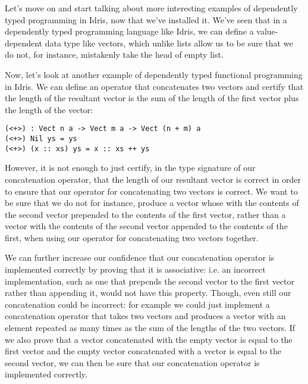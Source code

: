 Let's move on and start talking about more interesting examples of
dependently typed programming in Idris, now that we've installed it.
We've seen that in a dependently typed programming language like Idris,
we can define a value-dependent data type like vectors, which unlike lists
allow us to be sure that we do not, for instance, mistakenly take the
head of empty list.

Now, let's look at another example of dependently typed functional programming
in Idris. We can define an operator that concatenates two vectors and certify
that the length of the resultant vector is the sum of the length of the
first vector plus the length of the vector:

\begin{lstlisting}
(<+>) : Vect n a -> Vect m a -> Vect (n + m) a
(<+>) Nil ys = ys
(<+>) (x :: xs) ys = x :: xs ++ ys
\end{lstlisting}

However, it is not enough to just certify, in the type signature of our concatenation operator,
that the length of our resultant vector is correct in order to ensure that our operator
for concatenating two vectors is correct. We want to be sure that we do not for instance,
produce a vector whose with the contents of the second vector prepended to the contents of
the first vector, rather than a vector with the contents of the second vector appended to the
contents of the first, when using our operator for concatenating two vectors together.

We can further increase our confidence that our concatenation operator is implemented
correctly by proving that it is associative: i.e. an incorrect implementation, such as
one that prepends the second vector to the first vector rather than appending it, would
not have this property. Though, even still our concatenation could be incorrect: for
example we could just implement a concatenation operator that takes two vectors and
produces a vector with an element repeated as many times as the sum of the lengths of the
two vectors. If we also prove that a vector concatenated with the empty vector is equal
to the first vector and the empty vector concatenated with a vector is equal to the second
vector, we can then be sure that our concatenation operator is implemented correctly.


